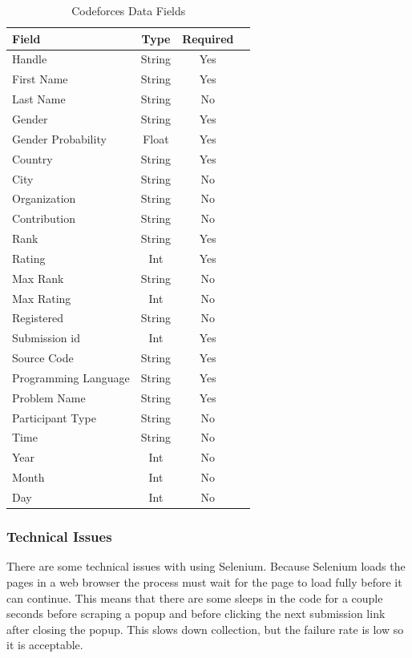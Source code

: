 \documentclass[12pt]{article}
\begin{document}
\begin{table}[t]
    \begin{center}
        \caption{Codeforces Data Fields}
        \label{tab:cf_data}
        \begin{tabular}{|l | c | c | c |}
            \hline
            \textbf{Field} & \textbf{Type} & \textbf{Required}\\
            \hline
            Handle & String & Yes\\
            First Name & String & Yes\\
            Last Name & String & No\\
            Gender & String & Yes\\
            Gender Probability & Float & Yes\\
            Country & String & Yes\\
            City & String & No\\
            Organization & String & No\\
            Contribution & String & No\\
            Rank & String & Yes\\
            Rating & Int & Yes\\
            Max Rank & String & No\\
            Max Rating & Int & No\\
            Registered & String & No\\
            \hline
            Submission id & Int & Yes\\
            Source Code & String & Yes\\
            Programming Language & String & Yes\\
            Problem Name & String & Yes\\
            Participant Type & String & No\\
            Time & String & No\\
            Year & Int & No\\
            Month & Int & No\\
            Day & Int & No\\
            \hline
        \end{tabular}
    \end{center}
\end{table}

\subsubsection*{Technical Issues}
There are some technical issues with using Selenium. Because Selenium loads the pages in a web browser the process must wait for the page to load fully before it can continue. This means that there are some sleeps in the code for a couple seconds before scraping a popup and before clicking the next submission link after closing the popup. This slows down collection, but the failure rate is low so it is acceptable.
\end{document}
